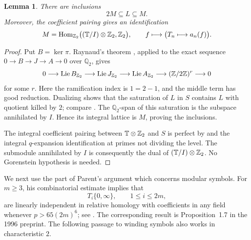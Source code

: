 \documentclass[11pt]{article}
\newtheorem{lemma}[theorem]{Lemma}
\theoremstyle{remark}\newtheorem{remark}[theorem]{Remark}
\newcommand{\Q}{\mathbb Q}\newcommand{\Z}{\mathbb Z}
\begin{document}
\begin{lemma}\label{lem:lattice}
There are inclusions
\[
 2M\subseteq L\subseteq M.
\]
Moreover, the coefficient pairing gives an identification
\[
 M=\Hom_{\Z_2}\bigl((\T/I)\otimes\Z_2,\Z_2\bigr),
 \qquad f\longmapsto\bigl(T_n\longmapsto a_n(f)\bigr).
\]
\end{lemma}
\begin{proof}
Put $B=\ker\pi$. Raynaud's theorem
\cite[Appendix~A, Theorem~A.1]{AU}, applied to the exact sequence
$0\to B\to J\to A\to0$ over $\Q_2$, gives
\[
 0\longrightarrow\Lie B_{\Z_2}\longrightarrow\Lie J_{\Z_2}
 \longrightarrow\Lie A_{\Z_2}\longrightarrow(\Z/2\Z)^r
 \longrightarrow0
\]
for some $r$. Here the ramification index is $1=2-1$, and the middle
term has good reduction. Dualizing shows that the saturation of $L$
in $S$ contains $L$ with quotient killed by $2$; compare
\cite[Section~4.4, proof of Theorem~3.10]{ARS}.
The $\Q_2$-span of this saturation is the subspace annihilated
by $I$. Hence its integral lattice is $M$, proving the inclusions.

The integral coefficient pairing between $\T\otimes\Z_2$ and $S$
is perfect by \cite[Lemma~2.1]{AU} and the integral
$q$-expansion identification at primes not dividing the level.
The submodule annihilated by $I$ is consequently the dual of
$(\T/I)\otimes\Z_2$. No Gorenstein hypothesis is needed.
\end{proof}

We next use the part of Parent's argument which concerns modular symbols.
For $m\geq3$, his combinatorial estimate implies that
\[
 T_i\{0,\infty\},\qquad 1\leq i\leq2m,
\]
are linearly independent in relative homology with coefficients in any
field whenever $p>65(2m)^6$; see \cite[Proposition~1.9]{Parent}.
The corresponding result is Proposition~1.7 in the 1996 preprint.
The following passage to winding symbols also works in characteristic $2$.
\end{document}
